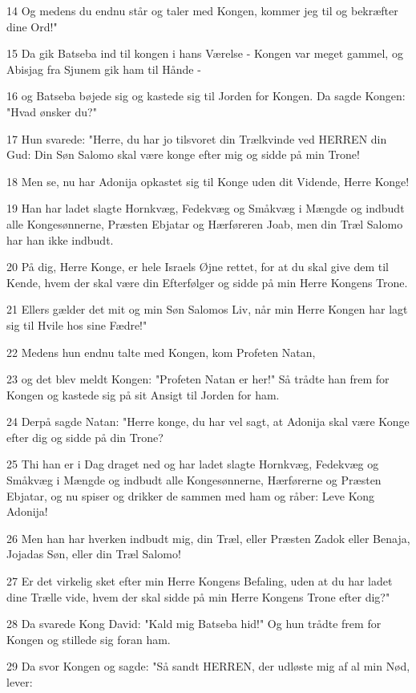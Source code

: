 \par 14 Og medens du endnu står og taler med Kongen, kommer jeg til og bekræfter dine Ord!"
\par 15 Da gik Batseba ind til kongen i hans Værelse - Kongen var meget gammel, og Abisjag fra Sjunem gik ham til Hånde -
\par 16 og Batseba bøjede sig og kastede sig til Jorden for Kongen. Da sagde Kongen: "Hvad ønsker du?"
\par 17 Hun svarede: "Herre, du har jo tilsvoret din Trælkvinde ved HERREN din Gud: Din Søn Salomo skal være konge efter mig og sidde på min Trone!
\par 18 Men se, nu har Adonija opkastet sig til Konge uden dit Vidende, Herre Konge!
\par 19 Han har ladet slagte Hornkvæg, Fedekvæg og Småkvæg i Mængde og indbudt alle Kongesønnerne, Præsten Ebjatar og Hærføreren Joab, men din Træl Salomo har han ikke indbudt.
\par 20 På dig, Herre Konge, er hele Israels Øjne rettet, for at du skal give dem til Kende, hvem der skal være din Efterfølger og sidde på min Herre Kongens Trone.
\par 21 Ellers gælder det mit og min Søn Salomos Liv, når min Herre Kongen har lagt sig til Hvile hos sine Fædre!"
\par 22 Medens hun endnu talte med Kongen, kom Profeten Natan,
\par 23 og det blev meldt Kongen: "Profeten Natan er her!" Så trådte han frem for Kongen og kastede sig på sit Ansigt til Jorden for ham.
\par 24 Derpå sagde Natan: "Herre konge, du har vel sagt, at Adonija skal være Konge efter dig og sidde på din Trone?
\par 25 Thi han er i Dag draget ned og har ladet slagte Hornkvæg, Fedekvæg og Småkvæg i Mængde og indbudt alle Kongesønnerne, Hærførerne og Præsten Ebjatar, og nu spiser og drikker de sammen med ham og råber: Leve Kong Adonija!
\par 26 Men han har hverken indbudt mig, din Træl, eller Præsten Zadok eller Benaja, Jojadas Søn, eller din Træl Salomo!
\par 27 Er det virkelig sket efter min Herre Kongens Befaling, uden at du har ladet dine Trælle vide, hvem der skal sidde på min Herre Kongens Trone efter dig?"
\par 28 Da svarede Kong David: "Kald mig Batseba hid!" Og hun trådte frem for Kongen og stillede sig foran ham.
\par 29 Da svor Kongen og sagde: "Så sandt HERREN, der udløste mig af al min Nød, lever:
